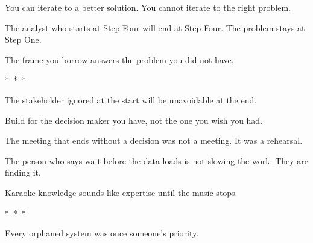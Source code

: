 You can iterate to a better solution. You cannot iterate to the right problem.


The analyst who starts at Step Four will end at Step Four. The problem stays at Step One.


The frame you borrow answers the problem you did not have.

\vspace{1.5em}
\begin{center}
  *~*~*
\end{center}
\vspace{1.5em}


The stakeholder ignored at the start will be unavoidable at the end.


Build for the decision maker you have, not the one you wish you had.


The meeting that ends without a decision was not a meeting. It was a rehearsal.


The person who says wait before the data loads is not slowing the work. They are finding it.


Karaoke knowledge sounds like expertise until the music stops.

\vspace{1.5em}
\begin{center}
  *~*~*
\end{center}
\vspace{1.5em}


Every orphaned system was once someone's priority.


